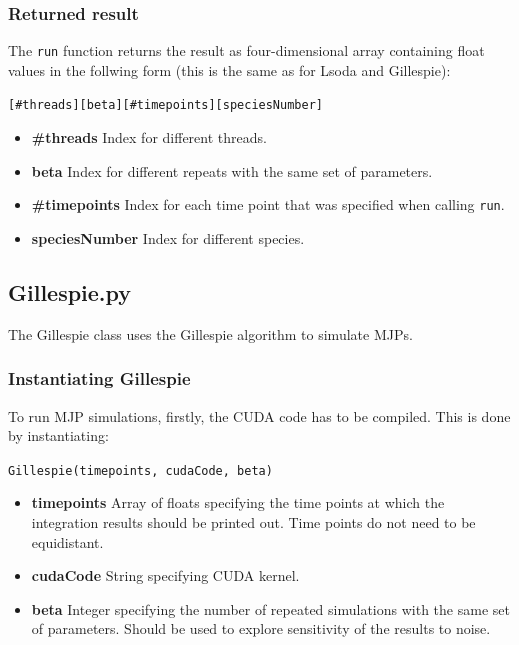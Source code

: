 \documentclass [11pt, a4paper, openany, twoside=off] {article}
\begin{document}
\subsubsection{Returned result}
The \verb$run$ function returns the result as four-dimensional array containing float values in the follwing form (this is the same as for Lsoda and Gillespie):
\begin{center}
\texttt{[\#threads][beta][\#timepoints][speciesNumber]}
\end{center}
\begin{itemize}
	\item \textbf{\#threads} Index for different threads.
	\item \textbf{beta} Index for different repeats with the same set of parameters.
	\item \textbf{\#timepoints} Index for each time point that was specified when calling \verb$run$.
	\item \textbf{speciesNumber} Index for different species.
\end{itemize}


\subsection{Gillespie.py}
The Gillespie class uses the Gillespie algorithm to simulate MJPs. 
\subsubsection{Instantiating Gillespie}
To run MJP simulations, firstly, the CUDA code has to be compiled. This is done by instantiating:
\begin{center}
\texttt{Gillespie(timepoints, cudaCode, beta)}
\end{center}
\begin{itemize}
	\item \textbf{timepoints} Array of floats specifying the time points at which the integration results should be printed out. Time points do not need to be equidistant.
	\item \textbf{cudaCode} String specifying CUDA kernel.
	\item \textbf{beta} Integer specifying the number of repeated simulations with the same set of parameters. Should be used to explore sensitivity of the results to noise.
\end{itemize}
\end{document}
